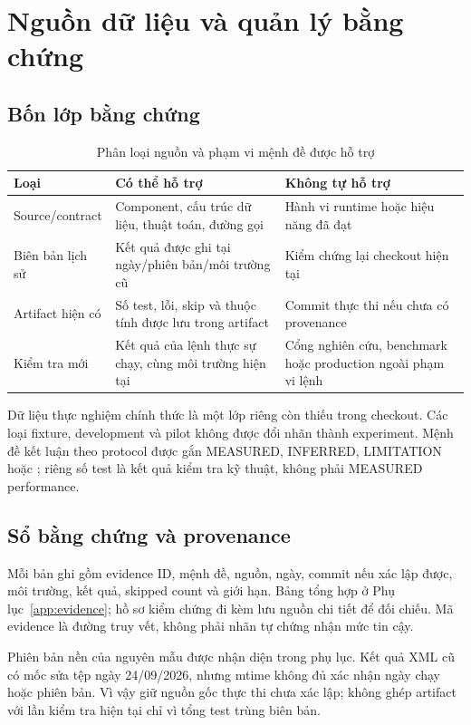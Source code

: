\section{Nguồn dữ liệu và quản lý bằng chứng}\label{sec:evidence-method}
\subsection{Bốn lớp bằng chứng}
\begin{table}[htbp]
\centering\caption{Phân loại nguồn và phạm vi mệnh đề được hỗ trợ}\label{tab:evidence-types}
\begin{tabularx}{\textwidth}{P{.22\textwidth}XX}
\toprule Loại & Có thể hỗ trợ & Không tự hỗ trợ \\
\midrule
Source\slash contract & Component, cấu trúc dữ liệu, thuật toán, đường gọi & Hành vi runtime hoặc hiệu năng đã đạt \\
Biên bản lịch sử & Kết quả được ghi tại ngày\slash phiên bản\slash môi trường cũ & Kiểm chứng lại checkout hiện tại \\
Artifact hiện có & Số test, lỗi, skip và thuộc tính được lưu trong artifact & Commit thực thi nếu chưa có provenance \\
Kiểm tra mới & Kết quả của lệnh thực sự chạy, cùng môi trường hiện tại & Cổng nghiên cứu, benchmark hoặc production ngoài phạm vi lệnh \\
\bottomrule\end{tabularx}
\end{table}
Dữ liệu thực nghiệm chính thức là một lớp riêng còn thiếu trong checkout. Các loại fixture, development và pilot không được đổi nhãn thành experiment. Mệnh đề kết luận theo protocol được gắn MEASURED, INFERRED, LIMITATION hoặc \PendingData; riêng số test là kết quả kiểm tra kỹ thuật, không phải MEASURED performance.

\subsection{Sổ bằng chứng và provenance}
Mỗi bản ghi gồm evidence ID, mệnh đề, nguồn, ngày, commit nếu xác lập được, môi trường, kết quả, skipped count và giới hạn. Bảng tổng hợp ở Phụ lục~\ref{app:evidence}; hồ sơ kiểm chứng đi kèm lưu nguồn chi tiết để đối chiếu. Mã evidence là đường truy vết, không phải nhãn tự chứng nhận mức tin cậy.

Phiên bản nền của nguyên mẫu được nhận diện trong phụ lục. Kết quả XML cũ có mốc sửa tệp ngày 24\slash 09\slash 2026, nhưng mtime không đủ xác nhận ngày chạy hoặc phiên bản. Vì vậy  giữ nguồn gốc thực thi chưa xác lập; không ghép artifact với lần kiểm tra hiện tại chỉ vì tổng test trùng biên bản.

